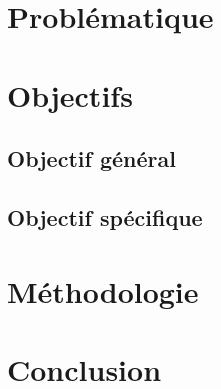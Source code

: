 	\section{Problématique}
	
	\section{Objectifs}
	
		\subsection{Objectif général}
		
		\subsection{Objectif spécifique}
		
	\section{Méthodologie}
	
	\section*{Conclusion}
